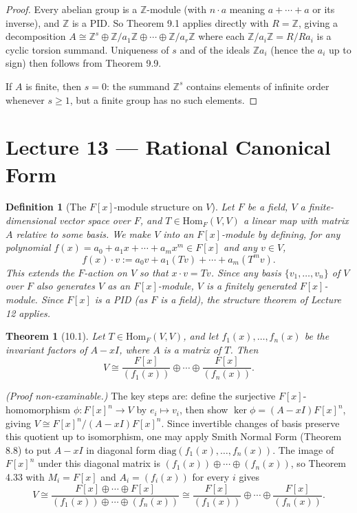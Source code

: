 \documentclass[12pt]{article}
\newtheorem{theorem}{Theorem}
\newtheorem{definition}{Definition}
\begin{document}
\begin{proof}
Every abelian group is a $\mathbb{Z}$-module (with $n \cdot a$ meaning $a + \cdots + a$ or its inverse), and $\mathbb{Z}$ is a PID. So Theorem 9.1 applies directly with $R = \mathbb{Z}$, giving a decomposition $A \cong \mathbb{Z}^s \oplus \mathbb{Z}/a_1\mathbb{Z} \oplus \cdots \oplus \mathbb{Z}/a_r\mathbb{Z}$ where each $\mathbb{Z}/a_i\mathbb{Z} = R/Ra_i$ is a cyclic torsion summand. Uniqueness of $s$ and of the ideals $\mathbb{Z}a_i$ (hence the $a_i$ up to sign) then follows from Theorem 9.9.

If $A$ is finite, then $s = 0$: the summand $\mathbb{Z}^s$ contains elements of infinite order whenever $s \geq 1$, but a finite group has no such elements.
\end{proof}

\section*{Lecture 13 — Rational Canonical Form}

\begin{definition}[{The $F[x]$-module structure on $V$}]
Let $F$ be a field, $V$ a finite-dimensional vector space over $F$, and $T \in \mathrm{Hom}_F(V,V)$ a linear map with matrix $A$ relative to some basis. We make $V$ into an $F[x]$-module by defining, for any polynomial $f(x) = a_0 + a_1x + \cdots + a_mx^m \in F[x]$ and any $v \in V$,
\[
  f(x) \cdot v := a_0 v + a_1(Tv) + \cdots + a_m(T^m v).
\]
This extends the $F$-action on $V$ so that $x \cdot v = Tv$. Since any basis $\{v_1, \ldots, v_n\}$ of $V$ over $F$ also generates $V$ as an $F[x]$-module, $V$ is a finitely generated $F[x]$-module. Since $F[x]$ is a PID (as $F$ is a field), the structure theorem of Lecture 12 applies.
\end{definition}

\begin{theorem}[10.1]
Let $T \in \mathrm{Hom}_F(V,V)$, and let $f_1(x), \ldots, f_n(x)$ be the invariant factors of $A - xI$, where $A$ is a matrix of $T$. Then
\[
  V \cong \frac{F[x]}{(f_1(x))} \oplus \cdots \oplus \frac{F[x]}{(f_n(x))}.
\]
\end{theorem}

\noindent\textit{(Proof non-examinable.)} The key steps are: define the surjective $F[x]$-homomorphism $\phi: F[x]^n \to V$ by $e_i \mapsto v_i$, then show $\ker \phi = (A - xI)F[x]^n$, giving $V \cong F[x]^n / (A-xI)F[x]^n$. Since invertible changes of basis preserve this quotient up to isomorphism, one may apply Smith Normal Form (Theorem 8.8) to put $A - xI$ in diagonal form $\mathrm{diag}(f_1(x), \ldots, f_n(x))$. The image of $F[x]^n$ under this diagonal matrix is $(f_1(x)) \oplus \cdots \oplus (f_n(x))$, so Theorem 4.33 with $M_i = F[x]$ and $A_i = (f_i(x))$ for every $i$ gives
\[
  V \cong \frac{F[x] \oplus \cdots \oplus F[x]}{(f_1(x)) \oplus \cdots \oplus (f_n(x))} \cong \frac{F[x]}{(f_1(x))} \oplus \cdots \oplus \frac{F[x]}{(f_n(x))}.
\]
\end{document}
